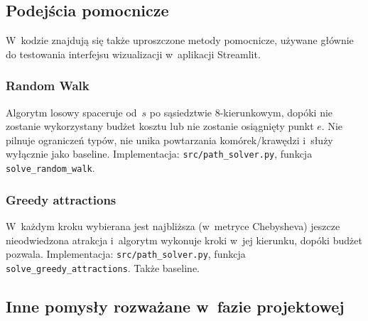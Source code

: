 \subsection{Podejścia pomocnicze}
\label{sec:baselines}

W~kodzie znajdują się także uproszczone metody pomocnicze, używane głównie
do testowania interfejsu wizualizacji w~aplikacji Streamlit.

\subsubsection{Random Walk}

Algorytm losowy spaceruje od~$s$ po sąsiedztwie 8-kierunkowym, dopóki nie
zostanie wykorzystany budżet kosztu lub nie zostanie osiągnięty punkt $e$.
Nie pilnuje ograniczeń typów, nie unika powtarzania komórek/krawędzi
i~służy wyłącznie jako baseline. Implementacja: \texttt{src/path\_solver.py},
funkcja \texttt{solve\_random\_walk}.

\subsubsection{Greedy attractions}

W~każdym kroku wybierana jest najbliższa (w~metryce Chebysheva) jeszcze
nieodwiedzona atrakcja i~algorytm wykonuje kroki w~jej kierunku, dopóki
budżet pozwala. Implementacja: \texttt{src/path\_solver.py}, funkcja
\texttt{solve\_greedy\_attractions}. Także baseline.

\subsection{Inne pomysły rozważane w~fazie projektowej}
\label{sec:other-ideas}

